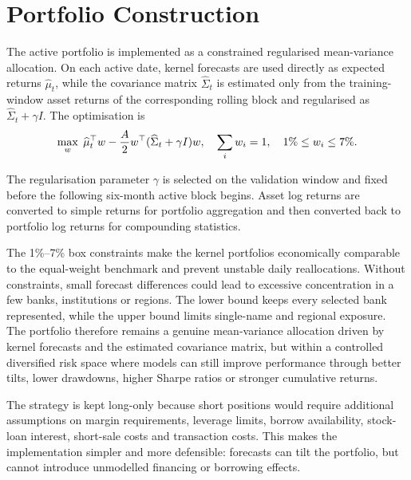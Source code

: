 ﻿\documentclass[10pt,a4paper]{article}
\begin{document}
\section{Portfolio Construction}

The active portfolio is implemented as a constrained regularised mean-variance allocation. On each active date, kernel forecasts are used directly as expected returns \(\widehat\mu_t\), while the covariance matrix \(\widehat\Sigma_t\) is estimated only from the training-window asset returns of the corresponding rolling block and regularised as \(\widehat\Sigma_t+\gamma I\). The optimisation is
\vspace{-0.125cm}
\[
\max_w\; \widehat\mu_t^\top w-\frac{A}{2}w^\top(\widehat\Sigma_t+\gamma I)w,
\quad
\sum_i w_i=1,
\quad
1\%\le w_i\le 7\%.
\vspace{-0.125cm}
\]

The regularisation parameter \(\gamma\) is selected on the validation window and fixed before the following six-month active block begins. Asset log returns are converted to simple returns for portfolio aggregation and then converted back to portfolio log returns for compounding statistics.

The 1\%--7\% box constraints make the kernel portfolios economically comparable to the equal-weight benchmark and prevent unstable daily reallocations. Without constraints, small forecast differences could lead to excessive concentration in a few banks, institutions or regions. The lower bound keeps every selected bank represented, while the upper bound limits single-name and regional exposure. The portfolio therefore remains a genuine mean-variance allocation driven by kernel forecasts and the estimated covariance matrix, but within a controlled diversified risk space where models can still improve performance through better tilts, lower drawdowns, higher Sharpe ratios or stronger cumulative returns.

The strategy is kept long-only because short positions would require additional assumptions on margin requirements, leverage limits, borrow availability, stock-loan interest, short-sale costs and transaction costs. This makes the implementation simpler and more defensible: forecasts can tilt the portfolio, but cannot introduce unmodelled financing or borrowing effects.
\end{document}
